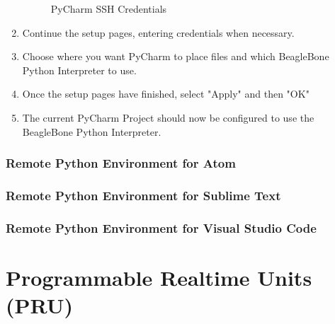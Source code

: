 \begin{enumerate}
\begin{figure}[H]
                \caption{PyCharm SSH Credentials}
                \label{fig:PyCharmSSHInterpreter}
            \end{figure}
            \item Continue the setup pages, entering credentials when necessary.
            \item Choose where you want PyCharm to place files and which BeagleBone Python Interpreter to use.
            \item Once the setup pages have finished, select "Apply" and then "OK"
            \item The current PyCharm Project should now be configured to use the BeagleBone Python Interpreter.
        \end{enumerate}
        \subsubsection{Remote Python Environment for Atom}
        \subsubsection{Remote Python Environment for Sublime Text}
        \subsubsection{Remote Python Environment for Visual Studio Code}

\section{Programmable Realtime Units (PRU)}